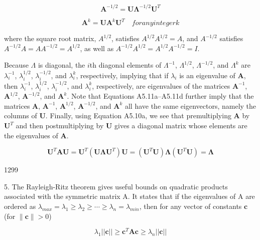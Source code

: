 \documentclass{article}
\begin{document}
\begin{equation}
\mathbf{A}^{-1/2}=\mathbf{U}\boldsymbol{\Lambda}^{-1/2}\mathbf{U}^{T}
\end{equation}

\begin{equation}
\mathbf{A}^{k}=\mathbf{U}\mathbf{A}^{k}\mathbf{U}^{T}\quad for any integer k
\end{equation}

where the square root matrix,  $ A^{1/2} $, satisfies  $ A^{1/2}A^{1/2} = A $, and  $ A^{-1/2} $ satisfies  $ A^{-1/2}A = AA^{-1/2} = A^{1/2} $, as well as  $ A^{-1/2}A^{1/2} = A^{1/2}A^{-1/2} = I $.

Because $\Lambda$ is diagonal, the $i$th diagonal elements of $\Lambda^{-1}$, $\Lambda^{1/2}$, $\Lambda^{-1/2}$, and $\Lambda^{k}$ are $\lambda_{i}^{-1}$, $\lambda_{i}^{1/2}$, $\lambda_{i}^{-1/2}$, and $\lambda_{i}^{k}$, respectively, implying that if $\lambda_{i}$ is an eigenvalue of $\mathbf{A}$, then $\lambda_{i}^{-1}$, $\lambda_{i}^{1/2}$, $\lambda_{i}^{-1/2}$, and $\lambda_{i}^{k}$, respectively, are eigenvalues of the matrices $\mathbf{A}^{-1}$, $\mathbf{A}^{1/2}$, $\mathbf{A}^{-1/2}$, and $\mathbf{A}^{k}$. Note that Equations A5.11a–A5.11d further imply that the matrices $\mathbf{A}$, $\mathbf{A}^{-1}$, $\mathbf{A}^{1/2}$, $\mathbf{A}^{-1/2}$, and $\mathbf{A}^{k}$ all have the same eigenvectors, namely the columns of $\mathbf{U}$. Finally, using Equation A5.10a, we see that premultiplying $\mathbf{A}$ by $\mathbf{U}^{T}$ and then postmultiplying by $\mathbf{U}$ gives a diagonal matrix whose elements are the eigenvalues of $\mathbf{A}$.

\begin{equation}
\mathbf{U}^{T}\mathbf{A}\mathbf{U}=\mathbf{U}^{T}(\mathbf{U}\boldsymbol{\Lambda}\mathbf{U}^{T})\mathbf{U}=(\mathbf{U}^{T}\mathbf{U})\boldsymbol{\Lambda}(\mathbf{U}^{T}\mathbf{U})=\boldsymbol{\Lambda}
\end{equation}

1299

5. The Rayleigh-Ritz theorem gives useful bounds on quadratic products associated with the symmetric matrix A. It states that if the eigenvalues of A are ordered as  $ \lambda_{max} = \lambda_1 \geq \lambda_2 \geq \cdots \geq \lambda_n = \lambda_{min} $, then for any vector of constants  $ \mathbf{c} $ (for  $ \|\mathbf{c}\| > 0 $)

\begin{equation}
\lambda_{1}\left|\left|\mathbf{c}\right|\right|\geq\mathbf{c}^{T}\mathbf{A}\mathbf{c}\geq\lambda_{n}\left|\left|\mathbf{c}\right|\right|
\end{equation}
\end{document}
